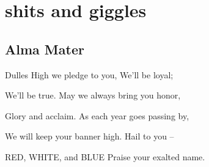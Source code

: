 \documentclass[11pt]{article}
\begin{document}
\section{shits and giggles}
\subsection{Alma Mater}
Dulles High we pledge to you, We’ll be loyal;

We’ll be true.  May we always bring you honor,

Glory and acclaim.  As each year goes passing by,

We will keep your banner high.  Hail to you –

RED, WHITE, and BLUE Praise your exalted name.
\end{document}
